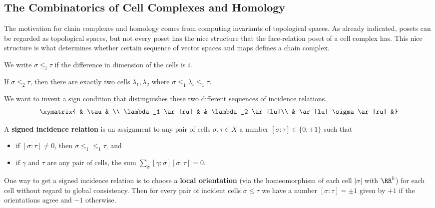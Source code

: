 \subsection{The Combinatorics of Cell Complexes and Homology}

The motivation for chain complexes and homology comes from computing invariants of topological spaces. As already indicated, posets can be regarded as topological spaces, but not every poset has the nice structure that the face-relation poset of a cell complex has. This nice structure is what determines whether certain sequence of vector spaces and maps defines a chain complex.

\begin{defn}
We write $\sigma \leq_i \tau$ if the difference in dimension of the cells is $i$.
\end{defn}

\begin{lem}\label{lem:2cells}
 If $\sigma\leq_2\tau$, then there are exactly two cells $\lambda_1,\lambda_2$ where $\sigma\leq_1\lambda_i\leq_1\tau$.
\end{lem}

We want to invent a sign condition that distinguishes these two different sequences of incidence relations.
\[
	\xymatrix{ & \tau & \\ \lambda_1 \ar[ru] & & \lambda_2 \ar[lu]\\ & \ar[lu] \sigma \ar[ru] &}
\]

\begin{defn}
 A \textbf{signed incidence relation} is an assignment to any pair of cells $\sigma,\tau\in X$ a number $[\sigma:\tau]\in\{0,\pm 1\}$ such that 
 \begin{itemize}
 \item if $[\sigma:\tau]\neq 0$, then $\sigma\leq_1\leq _1 \tau$, and
 \item if $\gamma$ and $\tau$ are any pair of cells, the sum $\sum_{\sigma}[\gamma:\sigma][\sigma:\tau]=0$.
 \end{itemize}
\end{defn}

One way to get a signed incidence relation is to choose a \textbf{local orientation} (via the homeomorphism of each cell $|\sigma|$ with $\RR^k$) for each cell without regard to global consistency. Then for every pair of incident cells $\sigma\leq\tau$ we have a number $[\sigma:\tau]=\pm1$ given by $+1$ if the orientations agree and $-1$ otherwise.

